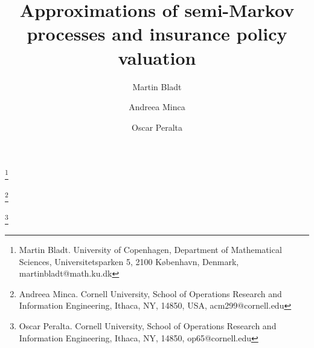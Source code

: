 \documentclass[11pt,leqno]{amsart}
\numberwithin{table}{section}
\numberwithin{figure}{section}
\numberwithin{equation}{section}
\newcommand{\1}{{\mathds{1}}}
\newcommand{\0}{\mat{0}}
\begin{document}
\title[Approximations of semi-Markov processes and insurance policy valuation]{Approximations of semi-Markov processes and insurance policy valuation}

\author[M. Bladt]{Martin Bladt}
\thanks{Martin Bladt. University of Copenhagen, Department of Mathematical Sciences, Universitetsparken 5,
2100 K{\o}benhavn, Denmark, martinbladt@math.ku.dk}



\author[A. Minca]{Andreea Minca}
\thanks{Andreea Minca. Cornell University, School of Operations Research and Information Engineering, Ithaca,
NY, 14850, USA, acm299@cornell.edu}

\author[O. Peralta]{Oscar Peralta}
\thanks{Oscar Peralta. Cornell University, School of Operations Research and Information Engineering, Ithaca, NY, 14850,
op65@cornell.edu}

\maketitle
\end{document}
